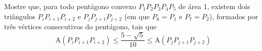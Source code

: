 Mostre que, para todo pentágono convexo $P_1P_2P_3P_4P_5$ de área 1, existem dois triângulos $P_i P_{i+1}P _{i+2}$ e
$P_jP _{j+1}P _{j+2}$ (em que $P_6 = P_1$ e $P_7 = P_2$), formados por três vértices consecutivos do pentágono, tais que
$$\mathrm{A}(P_i P_{i+1} P_{i+2}) \le \frac{5-\sqrt{5}}{10} \le \mathrm{A}(P_j P_{j+1} P_{j+2})$$